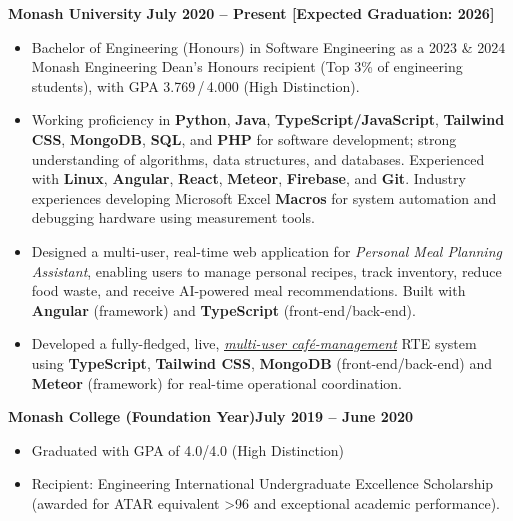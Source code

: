 \documentclass[11pt, a4paper]{article}
\let\hrefnoul\href
\renewcommand{\href}[2]{\hrefnoul{#1}{\ul{#2}}}
\begin{document}
\noindent\textbf{Monash University}%
\hfill\textbf{July 2020 – Present [Expected Graduation: 2026]}

\begin{itemize}[leftmargin=1.5em, itemsep=3pt, topsep=2pt, parsep=0pt]
  \item Bachelor of Engineering (Honours) in Software Engineering as a 2023 \& 2024 Monash
        Engineering Dean's Honours recipient (Top 3\% of engineering students), with GPA
        3.769\,/\,4.000 (High Distinction).

  \item Working proficiency in \textbf{Python}, \textbf{Java}, \textbf{TypeScript/JavaScript},
        \textbf{Tailwind CSS}, \textbf{MongoDB}, \textbf{SQL}, and \textbf{PHP} for software
        development; strong understanding of algorithms, data structures, and databases.
        Experienced with \textbf{Linux}, \textbf{Angular}, \textbf{React}, \textbf{Meteor},
        \textbf{Firebase}, and \textbf{Git}. Industry experiences developing Microsoft Excel
        \textbf{Macros} for system automation and debugging hardware using measurement tools.

  \item Designed a multi-user, real-time web application for \textit{Personal Meal Planning
        Assistant}, enabling users to manage personal recipes, track inventory, reduce food
        waste, and receive AI-powered meal recommendations. Built with \textbf{Angular}
        (framework) and \textbf{TypeScript} (front-end/back-end).

  \item Developed a fully-fledged, live,
        \href{https://github.com/Monash-FIT3170/2025W2-PressUp}{\textit{multi-user café-management}}
        RTE system using \textbf{TypeScript}, \textbf{Tailwind CSS}, \textbf{MongoDB}
        (front-end/back-end) and \textbf{Meteor} (framework) for real-time operational
        coordination.
\end{itemize}

\vspace{4pt}
\noindent\textbf{Monash College (Foundation Year)}\hfill\textbf{July 2019 – June 2020}

\begin{itemize}[leftmargin=1.5em, itemsep=3pt, topsep=2pt, parsep=0pt]
  \item Graduated with GPA of 4.0/4.0 (High Distinction)

  \item Recipient: Engineering International Undergraduate Excellence Scholarship (awarded for
        ATAR equivalent >96 and exceptional academic performance).
\end{itemize}
\end{document}
